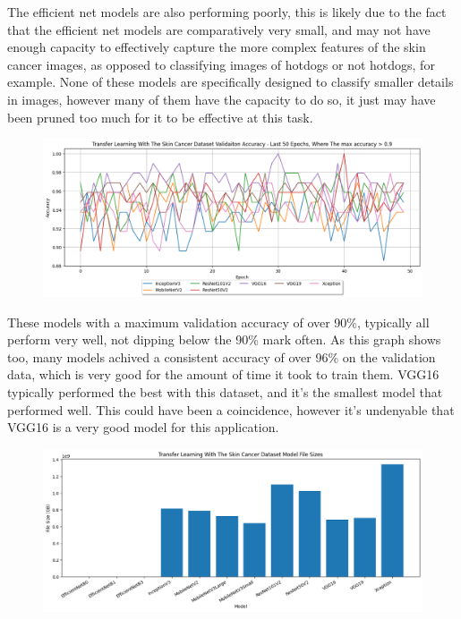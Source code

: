 \documentclass[]{final_report}
\begin{document}
The efficient net models are also performing poorly, this is likely due to the fact that the efficient net models are comparatively very small, and may not have enough capacity to effectively capture the more complex features of the skin cancer images, as opposed to classifying images of hotdogs or not hotdogs, for example. None of these models are specifically designed to classify smaller details in images, however many of them have the capacity to do so, it just may have been pruned too much for it to be effective at this task.

\begin{figure}[ht!]
  \centering
  \includegraphics[width=1.1\textwidth]{images/Skin-cancer-validation-accuracy-last-50-high-performers.png}
\end{figure}

These models with a maximum validation accuracy of over 90\%, typically all perform very well, not dipping below the 90\% mark often. As this graph shows too, many models achived a consistent accuracy of over 96\% on the validation data, which is very good for the amount of time it took to train them. VGG16 typically performed the best with this dataset, and it's the smallest model that performed well. This could have been a coincidence, however it's undenyable that VGG16 is a very good model for this application.

\begin{figure}[ht!]
  \centering
  \includegraphics[width=1.1\textwidth]{images/skin-cancer-model-sizes-graph.png}
\end{figure}
\end{document}

